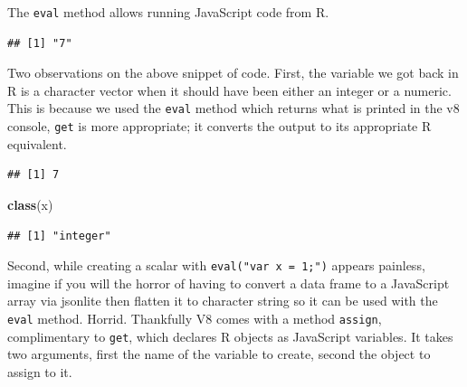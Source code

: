 \documentclass[
]{krantz}
\makeatletter
\newenvironment{Shaded}{\begin{snugshade}}{\end{snugshade}}
\newcommand{\CommentTok}[1]{\textcolor[rgb]{0.37,0.37,0.37}{\textit{#1}}}
\newcommand{\KeywordTok}[1]{\textcolor[rgb]{0.27,0.27,0.27}{\textbf{#1}}}
\newcommand{\NormalTok}[1]{#1}
\newcommand{\OperatorTok}[1]{\textcolor[rgb]{0.43,0.43,0.43}{\textbf{#1}}}
\newcommand{\StringTok}[1]{\textcolor[rgb]{0.5,0.5,0.5}{#1}}
\newenvironment{kframe}{%
\medskip{}
\setlength{\fboxsep}{.8em}
 \def\at@end@of@kframe{}%
 \ifinner\ifhmode%
  \def\at@end@of@kframe{\end{minipage}}%
  \begin{minipage}{\columnwidth}%
 \fi\fi%
 \def\FrameCommand##1{\hskip\@totalleftmargin \hskip-\fboxsep
 \colorbox{shadecolor}{##1}\hskip-\fboxsep
     \hskip-\linewidth \hskip-\@totalleftmargin \hskip\columnwidth}%
 \MakeFramed {\advance\hsize-\width
   \@totalleftmargin\z@ \linewidth\hsize
   \@setminipage}}%
 {\par\unskip\endMakeFramed%
 \at@end@of@kframe}
\renewenvironment{Shaded}{\begin{kframe}}{\end{kframe}}
\makeatother
\begin{document}
The \texttt{eval} method allows running JavaScript code from R.

\begin{Shaded}
\end{Shaded}

\begin{verbatim}
## [1] "7"
\end{verbatim}

Two observations on the above snippet of code. First, the variable we got back in R is a character vector when it should have been either an integer or a numeric. This is because we used the \texttt{eval} method which returns what is printed in the v8 console, \texttt{get} is more appropriate; it converts the output to its appropriate R equivalent.

\begin{Shaded}
\end{Shaded}

\begin{verbatim}
## [1] 7
\end{verbatim}

\begin{Shaded}
\begin{Highlighting}[]
\KeywordTok{class}\NormalTok{(x)}
\end{Highlighting}
\end{Shaded}

\begin{verbatim}
## [1] "integer"
\end{verbatim}

Second, while creating a scalar with \texttt{eval("var\ x\ =\ 1;")} appears painless, imagine if you will the horror of having to convert a data frame to a JavaScript array via jsonlite then flatten it to character string so it can be used with the \texttt{eval} method. Horrid. Thankfully V8 comes with a method \texttt{assign}, complimentary to \texttt{get}, which declares R objects as JavaScript variables. It takes two arguments, first the name of the variable to create, second the object to assign to it.
\end{document}
